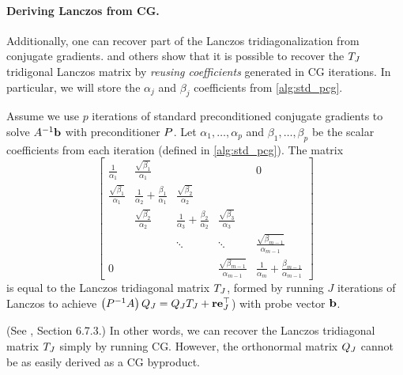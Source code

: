 \paragraph{Deriving Lanczos from CG.}
Additionally, one can recover part of the Lanczos tridiagonalization from conjugate gradients.
\citet{saad2003iterative} and others show that it is possible to recover the $T_J$ tridigonal Lanczos matrix by \emph{reusing coefficients} generated in CG iterations.
In particular, we will store the $\alpha_j$ and $\beta_j$ coefficients from \autoref{alg:std_pcg}.
%
\begin{observation}
  Assume we use $p$ iterations of standard preconditioned conjugate gradients to solve $A^{-1} \mathbf{b}$ with preconditioner $P$.
  Let $\alpha_1, \ldots, \alpha_p$ and $\beta_1, \ldots, \beta_p$ be the scalar coefficients from each iteration (defined in \autoref{alg:std_pcg}).
  The matrix
  \begin{equation*}
    \left[\begin{array}{ccccc}
      \frac{1}{\alpha_1} & \frac{\sqrt{\beta_1}}{\alpha_1} &  & & 0 \\
      \frac{\sqrt{\beta_1}}{\alpha_1} & \frac{1}{\alpha_2} + \frac{\beta_1}{\alpha_1} & \frac{\sqrt{\beta_2}}{\alpha_2} &  &  \\
      & \frac{\sqrt{\beta_2}}{\alpha_2} & \frac{1}{\alpha_3} + \frac{\beta_2}{\alpha_2} & \frac{\sqrt{\beta_3}}{\alpha_3} &  \\
      &       & \ddots & \ddots & \frac{\sqrt{\beta_{m-1}}}{\alpha_{m-1}} \\
      0 &       &        & \frac{\sqrt{\beta_{m-1}}}{\alpha_{m-1}} & \frac{1}{\alpha_m} + \frac{\beta_{m-1}}{\alpha_{m-1}}
    \end{array}\right]
  \end{equation*}
  is equal to the Lanczos tridiagonal matrix $T_J$, formed by running $J$ iterations of Lanczos to achieve $\left( P^{-1} A \right) Q_J = Q_J T_J + \mathbf{r} \mathbf{e}_J^\top$) with probe vector $\mathbf{b}$.
  \label{obs:lanczos_cg}
\end{observation}
(See \cite{saad2003iterative}, Section 6.7.3.)
In other words, we can recover the Lanczos tridiagonal matrix $T_J$ simply by running CG.
However, the orthonormal matrix $Q_J$ cannot be as easily derived as a CG byproduct.
